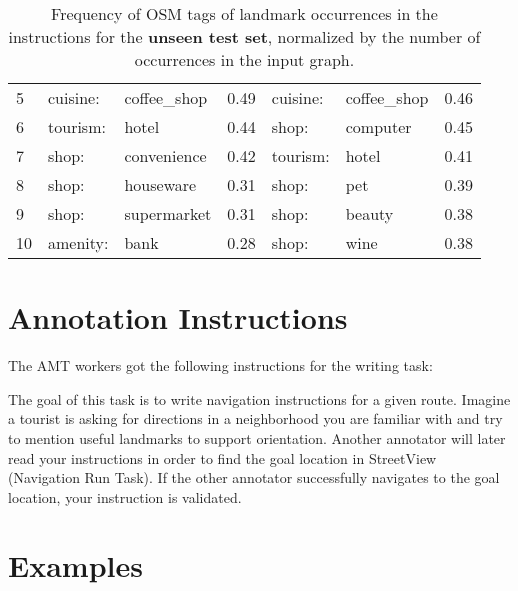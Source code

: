\documentclass[11pt,a4paper]{article}
\begin{document}
\begin{table}
{\begin{tabular}{l|lll|lll|}
\multicolumn{1}{|l|}{5}            & cuisine:        & coffee\_shop       & 0.49                                & cuisine:        & coffee\_shop       & 0.46                                \\
\multicolumn{1}{|l|}{6}            & tourism:        & hotel              & 0.44                                & shop:           & computer           & 0.45                                \\
\multicolumn{1}{|l|}{7}            & shop:           & convenience        & 0.42                                & tourism:        & hotel              & 0.41                                \\
\multicolumn{1}{|l|}{8}            & shop:           & houseware          & 0.31                                & shop:           & pet                & 0.39                                \\
\multicolumn{1}{|l|}{9}            & shop:           & supermarket        & 0.31                                & shop:           & beauty             & 0.38                                \\
\multicolumn{1}{|l|}{10}           & amenity:        & bank               & 0.28                                & shop:           & wine               & 0.38                                \\ \hline
\end{tabular}}
\caption{Frequency of OSM tags of landmark occurrences in the instructions for the \textbf{unseen test set}, normalized by the number of occurrences in the input graph.}
\label{tab:top_landmarks_unseen}
\end{table} 
\section{Annotation Instructions}
The AMT workers got the following instructions for the writing task:

The goal of this task is to write navigation instructions for a given route. Imagine a tourist is asking for directions in a neighborhood you are familiar with and try to mention useful landmarks to support orientation. Another annotator will later read your instructions in order to find the goal location in StreetView (Navigation Run Task). If the other annotator successfully navigates to the goal location, your instruction is validated.

\section{Examples}
\end{document}
